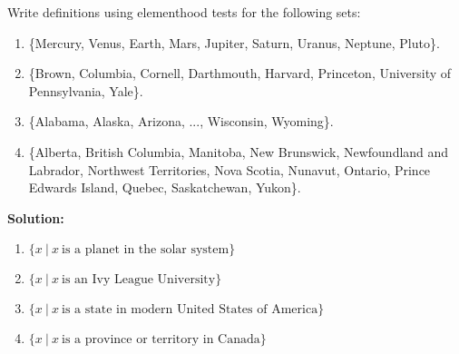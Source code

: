 Write definitions using elementhood tests for the following sets:
\begin{enumerate}[label=(\alph*)]
    \item \{Mercury, Venus, Earth, Mars, Jupiter, Saturn, Uranus, Neptune, Pluto\}.
    \item \{Brown, Columbia, Cornell, Darthmouth, Harvard, Princeton, University of Pennsylvania, Yale\}.
    \item \{Alabama, Alaska, Arizona, ..., Wisconsin, Wyoming\}.
    \item \{Alberta, British Columbia, Manitoba, New Brunswick, Newfoundland and Labrador, Northwest Territories, Nova Scotia, Nunavut, Ontario, Prince Edwards Island, Quebec, Saskatchewan, Yukon\}.
\end{enumerate}

\textbf{Solution:}
\begin{enumerate}[label=(\alph*)]
    \item $\{x \ | \ x \ \text{is a planet in the solar system}\}$
    \item $\{x \ | \ x \ \text{is an Ivy League University}\}$
    \item $\{x \ | \ x \ \text{is a state in modern United States of America}\}$
    \item $\{x \ | \ x \ \text{is a province or territory in Canada}\}$
\end{enumerate}

\pagebreak